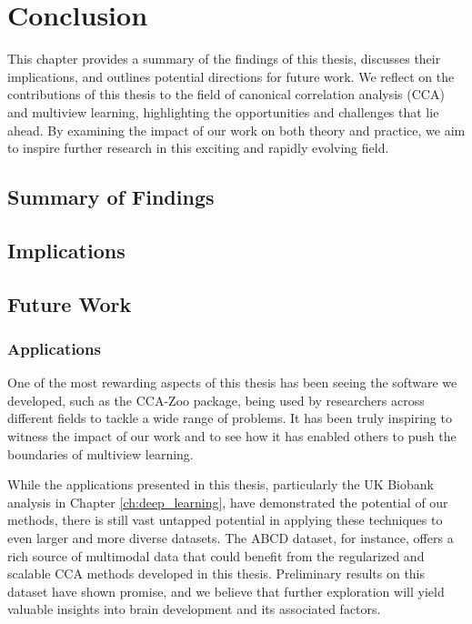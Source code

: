 \chapter{Conclusion}\label{ch:discussion}

This chapter provides a summary of the findings of this thesis, discusses their implications, and outlines potential directions for future work. We reflect on the contributions of this thesis to the field of canonical correlation analysis (CCA) and multiview learning, highlighting the opportunities and challenges that lie ahead. By examining the impact of our work on both theory and practice, we aim to inspire further research in this exciting and rapidly evolving field.

\section{Summary of Findings}



\section{Implications}

\section{Future Work}

\subsection{Applications}

One of the most rewarding aspects of this thesis has been seeing the software we developed, such as the CCA-Zoo package, being used by researchers across different fields to tackle a wide range of problems. It has been truly inspiring to witness the impact of our work and to see how it has enabled others to push the boundaries of multiview learning.

While the applications presented in this thesis, particularly the UK Biobank analysis in Chapter \ref{ch:deep_learning}, have demonstrated the potential of our methods, there is still vast untapped potential in applying these techniques to even larger and more diverse datasets. The ABCD dataset, for instance, offers a rich source of multimodal data that could benefit from the regularized and scalable CCA methods developed in this thesis. Preliminary results on this dataset have shown promise, and we believe that further exploration will yield valuable insights into brain development and its associated factors.

